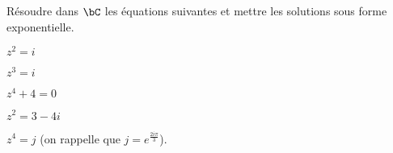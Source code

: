 
\begin{exercice}  \;
R\'esoudre dans $\bC$ les \'equations suivantes et mettre les solutions sous forme exponentielle.
\begin{enumerate}
\begin{minipage}[t]{0.45\textwidth}
\item $z^2=i$
\item $z^3=i$
\item $z^4+4=0$ 
\end{minipage}
\begin{minipage}[t]{0.45\textwidth}
\item $z^2=3-4i$
\item $z^4=j$ (on rappelle que $j=e^{\frac{2i\pi}{3}}$).
\end{minipage}
\end{enumerate}
\end{exercice}